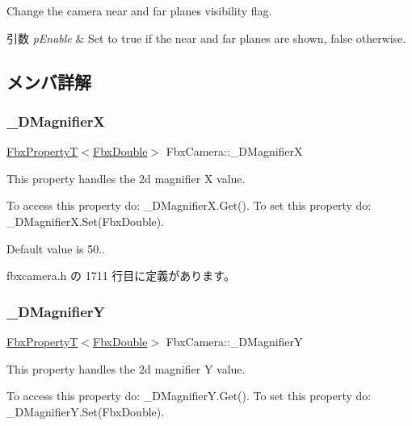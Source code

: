 Change the camera near and far planes visibility flag. 
\begin{DoxyParams}{引数}
{\em p\+Enable} & Set to {\ttfamily true} if the near and far planes are shown, {\ttfamily false} otherwise. \\
\hline
\end{DoxyParams}


\subsection{メンバ詳解}
\mbox{\label{class_fbx_camera_a0f5b732aa294c182fe6ac07ae70024fc}} 
\subsubsection{\texorpdfstring{\+\_\+D\+MagnifierX}{\_2DMagnifierX}}
{\footnotesize\ttfamily \hyperlink{class_fbx_property_t}{Fbx\+PropertyT}$<$\hyperlink{fbxtypes_8h_a171e72a1c46fc15c1a6c9c31948c1c5b}{Fbx\+Double}$>$ Fbx\+Camera\+::\+\_\+D\+MagnifierX}

This property handles the 2d magnifier X value.

To access this property do\+: \+\_\+D\+Magnifier\+X.\+Get(). To set this property do\+: \+\_\+D\+Magnifier\+X.\+Set(\+Fbx\+Double).

Default value is 50.. 

 fbxcamera.\+h の 1711 行目に定義があります。

\mbox{\label{class_fbx_camera_a162fa10866f3c4cf3c5a87ed64aef21e}} 
\subsubsection{\texorpdfstring{\+\_\+D\+MagnifierY}{\_2DMagnifierY}}
{\footnotesize\ttfamily \hyperlink{class_fbx_property_t}{Fbx\+PropertyT}$<$\hyperlink{fbxtypes_8h_a171e72a1c46fc15c1a6c9c31948c1c5b}{Fbx\+Double}$>$ Fbx\+Camera\+::\+\_\+D\+MagnifierY}

This property handles the 2d magnifier Y value.

To access this property do\+: \+\_\+D\+Magnifier\+Y.\+Get(). To set this property do\+: \+\_\+D\+Magnifier\+Y.\+Set(\+Fbx\+Double).

